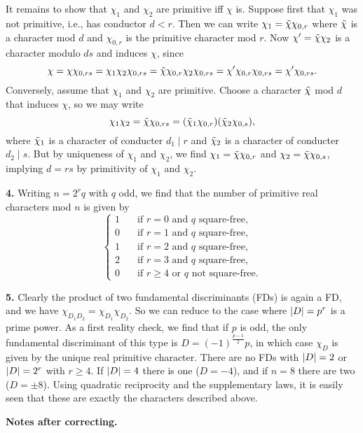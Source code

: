 \documentclass[a4paper,11pt]{article}
\begin{document}
It remains to show that $\chi_1$ and $\chi_2$ are primitive iff $\chi$ is. Suppose first
that $\chi_1$ was not primitive, i.e., has conductor $d < r$. Then we can write 
$\chi_1 = \Tilde \chi \chi_{0,r}$ where $\Tilde\chi$ is a character mod $d$ and 
$\chi_{0,r}$ is the primitive character mod $r$. Now $\chi' = \Tilde \chi \chi_2$ 
is a character modulo $ds$ and induces $\chi$, since
\[
    \chi = \chi \chi_{0,rs} = \chi_1 \chi_2 \chi_{0,rs} = \Tilde \chi \chi_{0,r}\chi_2
    \chi_{0,rs} = \chi' \chi_{0,r} \chi_{0,rs} = \chi' \chi_{0,rs}.
\]
Conversely, assume that $\chi_1$ and $\chi_2$ are primitive. 
Choose a character $\Tilde \chi$ mod $d$ that induces $\chi$, so we may write 
$$\chi_1\chi_2 = \Tilde \chi \chi_{0,rs} = (\Tilde \chi_1 \chi_{0,r}) (\Tilde \chi_2 
\chi_{0,s}),$$
where $\Tilde \chi_1$ is a character of conducter $d_1 \mid r$ and $\Tilde \chi_2$ is a 
character of conducter $d_2 \mid s$. But by uniqueness of $\chi_1$ and $\chi_2$, we
find $\chi_1 = \Tilde \chi \chi_{0,r}$ and $\chi_2 = \Tilde \chi \chi_{0,s}$, implying 
$d = rs$ by primitivity of $\chi_1$ and $\chi_2$. 

\textbf{4.} Writing $n = 2^r q$ with $q$ odd, we find that the number of primitive real
characters mod $n$ is given by 
\[
    \begin{cases}
        1 \quad &\text{if $r = 0$ and $q$ square-free}, \\
        0 \quad &\text{if $r = 1$ and $q$ square-free}, \\
        1 \quad &\text{if $r = 2$ and $q$ square-free}, \\
        2 \quad &\text{if $r = 3$ and $q$ square-free}, \\
        0 \quad &\text{if $r \geq 4$ or $q$ not square-free}. 
    \end{cases}
\]

\textbf{5.} Clearly the product of two fundamental discriminants (FDs) is again a FD,
and we have $\chi_{D_1 D_2} = \chi_{D_1}\chi_{D_2}$. So we can reduce to the case where
$\left\lvert D \right\rvert = p^r$ is a prime power. As a first reality check, we find that if $p$ is odd,
the only fundamental discriminant of this type is $D = (-1)^{\frac{p-1}2} p$,
in which case $\chi_D$ is given by the unique real primitive character. 
There are no FDs with $\left\lvert D \right\rvert =2$ or $\left\lvert D \right\rvert = 2^r$ with $r \geq 4$. If $\left\lvert D \right\rvert = 4$
there is one ($D = -4$), and if $n = 8$ there are two ($D = \pm 8$).
Using quadratic reciprocity and the supplementary laws, it is easily seen that these
are exactly the characters described above.

\textbf{Notes after correcting.} \leavevmode
\end{document}
